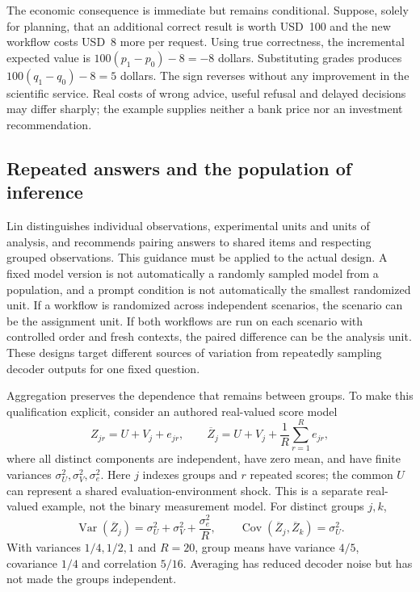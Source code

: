 The economic consequence is immediate but remains conditional. Suppose, solely
for planning, that an additional correct result is worth USD~100 and the new
workflow costs USD~8 more per request. Using true correctness, the incremental
expected value is $100(p_1-p_0)-8=-8$ dollars. Substituting grades produces
$100(q_1-q_0)-8=5$ dollars. The sign reverses without any improvement in the
scientific service. Real costs of wrong advice, useful refusal and delayed
decisions may differ sharply; the example supplies neither a bank price nor an
investment recommendation. \citep{exec20_validity_reference}

\subsection{Repeated answers and the population of inference}
\label{exec20:validity-dependence}

Lin distinguishes individual observations, experimental units and units of
analysis, and recommends pairing answers to shared items and respecting grouped
observations. This guidance must be applied to the actual design. A fixed model
version is not automatically a randomly sampled model from a population, and a
prompt condition is not automatically the smallest randomized unit. If a
workflow is randomized across independent scenarios, the scenario can be the
assignment unit. If both workflows are run on each scenario with controlled
order and fresh contexts, the paired difference can be the analysis unit. These
designs target different sources of variation from repeatedly sampling decoder
outputs for one fixed question. \citep{exec20_validity}

Aggregation preserves the dependence that remains between groups. To make this
qualification explicit, consider an authored real-valued score model
\begin{equation}
 Z_{jr}=U+V_j+e_{jr},\qquad
 \overline Z_j=U+V_j+\frac{1}{R}\sum_{r=1}^R e_{jr},
 \label{exec20:validity-shock}
\end{equation}
where all distinct components are independent, have zero mean, and have finite
variances $\sigma_U^2,\sigma_V^2,\sigma_e^2$. Here $j$ indexes groups and $r$
repeated scores; the common $U$ can represent a shared evaluation-environment
shock. This is a separate real-valued example, not the binary measurement model.
For distinct groups $j,k$,
\begin{equation}
 \operatorname{Var}(\overline Z_j)
 =\sigma_U^2+\sigma_V^2+\frac{\sigma_e^2}{R},\qquad
 \operatorname{Cov}(\overline Z_j,\overline Z_k)=\sigma_U^2.
 \label{exec20:validity-averages}
\end{equation}
With variances $1/4,1/2,1$ and $R=20$, group means have variance $4/5$,
covariance $1/4$ and correlation $5/16$. Averaging has reduced decoder noise
but has not made the groups independent. \citep{exec20_validity_reference}

